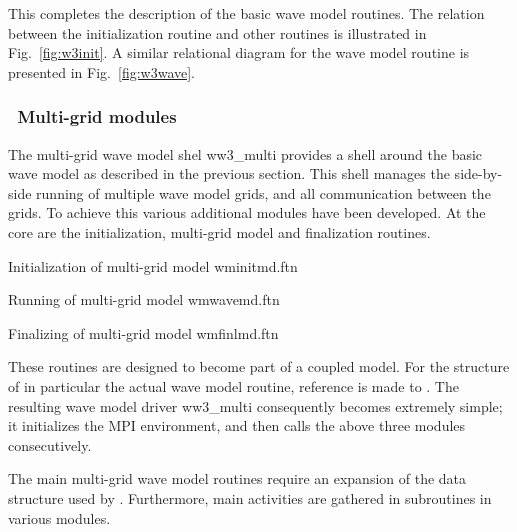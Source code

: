 \noindent
This completes the description of the basic wave model routines. The relation
between the initialization routine and other routines is illustrated in
Fig.~\ref{fig:w3init}. A similar relational diagram for the wave model routine
is presented in Fig.~\ref{fig:w3wave}.


\subsubsection{~Multi-grid modules} \label{sec:multi_mod}
\vsssub

The multi-grid wave model shel {\file ww3\_multi} provides a shell around the
basic wave model as described in the previous section. This shell manages the
side-by-side running of multiple wave model grids, and all communication
between the grids. To achieve this various additional modules have been
developed. At the core are the initialization, multi-grid model and
finalization routines.

\pb \noindent
Initialization of multi-grid model \hfill {\file wminitmd.ftn}

\begin{flisti}
\end{flisti}

\noindent
Running of multi-grid model \hfill {\file wmwavemd.ftn}

\begin{flisti}
\end{flisti}

\noindent
Finalizing of multi-grid model \hfill {\file wmfinlmd.ftn}

\begin{flisti}
\end{flisti}

\noindent
These routines are designed to become part of a coupled model. For the
structure of in particular the actual wave model routine, reference is made to
\cite{tol:MMAB07b}. The resulting wave model driver {\file ww3\_multi}
consequently becomes extremely simple; it initializes the MPI environment,
and then calls the above three modules consecutively. 

The main multi-grid wave model routines require an expansion of the data
structure used by \ws. Furthermore, main activities are gathered in
subroutines in various modules.

